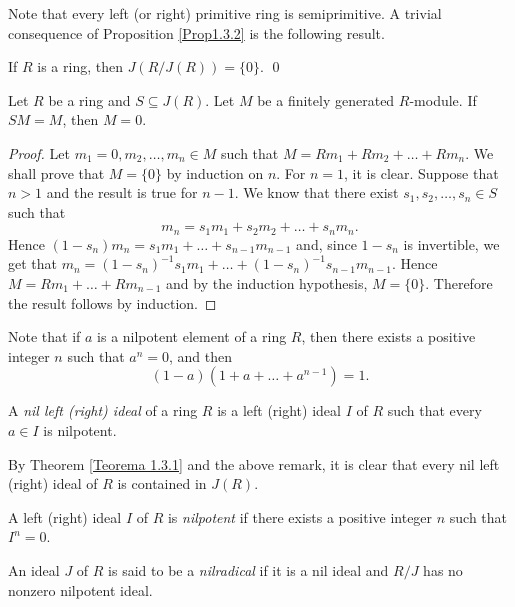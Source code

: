 Note that every left (or right) primitive ring is semiprimitive. A trivial 
consequence of Proposition \ref{Prop1.3.2} is the following result.

\begin{corollary}\label{Cor1.3.3}
    If $R$ is a ring, then $J(R/J(R))=\{0\}$. \qed
\end{corollary}

\begin{proposition}
Let $R$ be a ring and $S\subseteq J(R)$. Let $M$ be a finitely generated $R$-module. If $SM=M$, then $M=0$.
\end{proposition}

\begin{proof}
Let $m_1=0,m_2,\dots,m_n\in M$ such that $M=Rm_1+Rm_2+\dots+Rm_n$.
We shall prove that $M=\{0\}$ by induction on $n$. For $n=1$, it is clear. Suppose that $n>1$ and the result is true for $n-1$. 
We know that there exist $s_1,s_2,\dots,s_n\in S$ such that
$$m_n=s_1m_1+s_2m_2+\dots+s_nm_n.$$
Hence $(1-s_n)m_n=s_1m_1+\dots+s_{n-1}m_{n-1}$ and, since $1-s_n$ is invertible, we get that
$m_n=(1-s_n)^{-1}s_1m_1+\dots+(1-s_n)^{-1}s_{n-1}m_{n-1}$. Hence $M=Rm_1+\dots+Rm_{n-1}$ and by the induction hypothesis, $M=\{0\}$.
Therefore the result follows by induction.
\end{proof}

Note that if $a$ is a nilpotent element of a ring $R$, then there exists a positive integer $n$ such that $a^n=0$, and then
$$(1-a)(1+a+\dots+a^{n-1})=1.$$

\begin{definition}
A \emph{nil left (right) ideal} of a ring $R$ is a left (right) ideal $I$ of $R$ such that every $a\in I$ is nilpotent. 
\end{definition}

By Theorem \ref{Teorema 1.3.1} and the above remark,
it is clear that every nil left (right) ideal of $R$ is contained in $J(R)$.

\begin{definition}
A left (right) ideal $I$ of $R$ is \emph{nilpotent} if there exists a positive integer $n$ 
such that $I^n=0$. 
\end{definition}

\begin{definition}
An ideal $J$ of $R$ is said to be a \emph{nilradical} if it is a nil ideal and $R/J$ has no nonzero nilpotent ideal.
\end{definition}

